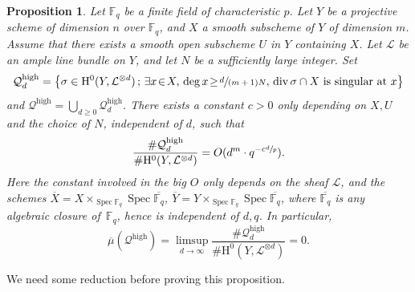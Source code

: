 \documentclass[11pt]{article}
\numberwithin{equation}{section}
\newcommand{\sep}{\,;\,}
\theoremstyle{plain}
\newtheorem{prop}[thm]{Proposition}
\theoremstyle{definition}
\newcommand{\ho}{\mathrm{H}}
\newcommand{\li}{\mathcal{L}}
\newcommand{\F}{\mathbb{F}}
\DeclareMathOperator{\Spec}{Spec}
\begin{document}
\begin{prop}\label{hifinite}
Let $\F_q$ be a finite field of characteristic $p$. Let $Y$ be a projective scheme of dimension $n$ over $\F_q$, and $X$ a smooth subscheme of $Y$ of dimension $m$. Assume that there exists a smooth open subscheme $U$ in $Y$ containing $X$. Let $\mathcal{L}$ be an ample line bundle on $Y$, and let $N$ be a sufficiently large integer.
Set\vspace*{-3pt}
\[
\mathcal{Q}_{d}^{\mathrm{high}}= \bigl\{ \sigma\in \ho^0(Y,\li^{\otimes d})\sep \exists x\!\in\!X,\, \deg x\!\geq\! \sfrac{d}{(m+1)N},\,\div \sigma\cap X \text{ is singular at }x \bigl\}
\]
and $\mathcal{Q}^{\mathrm{high}}=\bigcup_{d\geq 0}\mathcal{Q}_{d}^{\mathrm{high}}$.
There exists a constant $c>0$ only depending on $X,U$ and the choice of $N$, independent of $d$, such that\vspace*{-3pt}\enlargethispage{\baselineskip}
\[
\frac{ \#\mathcal{Q}_d^{\mathrm{high}}}{\# \ho^0(Y, \mathcal{L}^{\otimes d})}=O(d^{m}\cdot q^{-c\sfrac{d}{p}}).
\]
Here the constant involved in the big $O$ only depends on the sheaf $\li$, and the schemes $\overline{X}=X\times_{\Spec \F_q}\Spec \overline{\F_q}$, $\overline{Y}=Y\times_{\Spec \F_q}\Spec \overline{\F_q}$, where $\overline{\F_q}$ is any algebraic closure of~$\F_q$, hence is independent of $d,q$.
In particular,\vspace*{-3pt}
\[
\overline{\mu}(\mathcal{Q}^{\mathrm{high}})=\limsup_{d\to \infty} \frac{ \#\mathcal{Q}_d^{\mathrm{high}}}{\# \ho^0(Y, \mathcal{L}^{\otimes d})}=0.
\]
\end{prop}

We need some reduction before proving this proposition.
\end{document}
